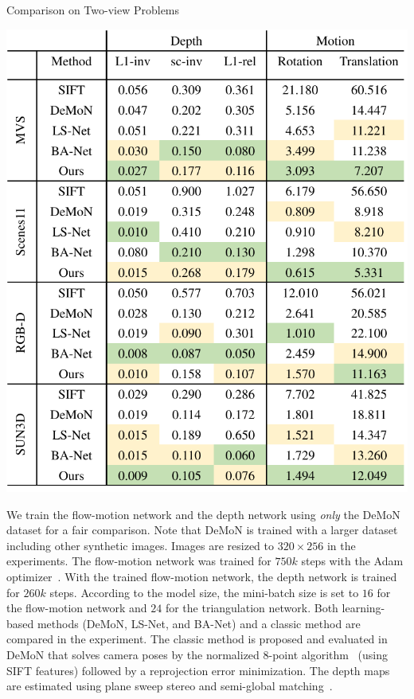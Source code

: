 \documentclass[letterpaper, 10 pt, conference]{ieeeconf}  %
\begin{document}
\begin{table}[t]
\centering
\vspace{0.3cm}
\caption{Comparison on Two-view Problems}
\label{two_view_compare}
\includegraphics[width=0.9\linewidth]{figs/two_view_compare.pdf}
\vspace{-0.7cm}
\end{table}
 
We train the flow-motion network and the depth network using \textit{only} the DeMoN dataset for a fair comparison. Note that DeMoN is trained with a larger dataset including other synthetic images. Images are resized to $320\times256$ in the experiments. The flow-motion network was trained for $750k$ steps with the Adam optimizer~\cite{adam}. With the trained flow-motion network, the depth network is trained for $260k$ steps. According to the model size, the mini-batch size is set to $16$ for the flow-motion network and $24$ for the triangulation network. Both learning-based methods (DeMoN, LS-Net, and BA-Net) and a classic method are compared in the experiment. The classic method is proposed and evaluated in DeMoN that solves camera poses by the normalized 8-point algorithm~\cite{8_point} (using SIFT features) followed by a reprojection error minimization. The depth maps are estimated using plane sweep stereo and semi-global matching~\cite{hirschmuller2008stereo}.
 
\end{document}
